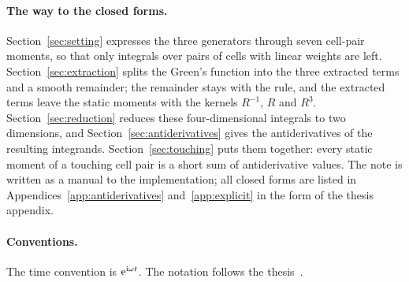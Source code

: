 \paragraph{The way to the closed forms.} Section~\ref{sec:setting} expresses the three generators through seven
cell-pair moments, so that only integrals over pairs of cells with linear weights are left. Section~\ref{sec:extraction}
splits the Green's function into the three extracted terms and a smooth remainder; the remainder stays with the \GL{}
rule, and the extracted terms leave the static moments with the kernels $R^{-1}$, $R$ and $R^3$. Section~\ref{sec:reduction}
reduces these four-dimensional integrals to two dimensions, and Section~\ref{sec:antiderivatives} gives the
antiderivatives of the resulting integrands. Section~\ref{sec:touching} puts them together: every static moment of a
touching cell pair is a short sum of antiderivative values. The note is written as a manual to the implementation; all
closed forms are listed in Appendices~\ref{app:antiderivatives} and~\ref{app:explicit} in the form of the thesis
appendix.

\paragraph{Conventions.} The time convention is $\mathrm{e}^{\mathrm{i}\omega t}$. The notation follows the
thesis~\cite{machacek2025method}.
